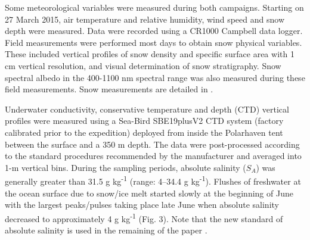\documentclass[essd, manuscript]{copernicus}
\begin{document}
Some meteorological variables were measured during both campaigns. Starting on 27 March 2015, air temperature and relative humidity, wind speed and snow depth were measured. Data were recorded using a CR1000 Campbell data logger. Field measurements were performed most days to obtain snow physical variables. These included vertical profiles of snow density and specific surface area with 1 cm vertical resolution, and visual determination of snow stratigraphy. Snow spectral albedo in the 400-1100 nm spectral range was also measured during these field measurements. Snow measurements are detailed in \citet{Verin2019}. 

Underwater conductivity, conservative temperature and depth (CTD) vertical profiles were measured using a Sea-Bird SBE19plusV2 CTD system (factory calibrated prior to the expedition) deployed from inside the Polarhaven tent between the surface and a 350 m depth. The data were post-processed according to the standard procedures recommended by the manufacturer and averaged into 1-m vertical bins. During the sampling periods, absolute salinity ($S_A$) was generally greater than 31.5 g kg\textsuperscript{-1} (range: 4--34.4 g kg\textsuperscript{-1}). Flushes of freshwater at the ocean surface due to snow/ice melt started slowly at the beginning of June with the largest peaks/pulses taking place late June when absolute salinity decreased to approximately 4 g kg\textsuperscript{-1} (Fig. 3). Note that the new standard of absolute salinity is used in the remaining of the paper \citep{Oziel2019, Randelhoff2019}.
\end{document}
